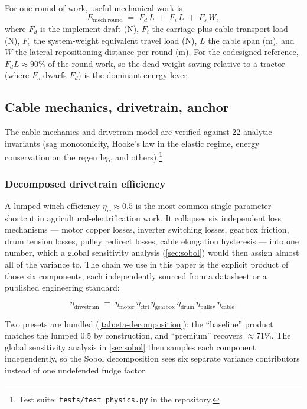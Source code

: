 \documentclass[11pt,a4paper]{article}
\begin{document}
For one round of work, useful mechanical work is
\begin{equation}\label{eq:pass}
E_{\text{mech,round}} \;=\; F_d\,L \;+\; F_i\,L \;+\; F_s\,W,
\end{equation}
where $F_d$ is the implement draft (N), $F_i$ the carriage-plus-cable transport load (N), $F_s$ the system-weight equivalent travel load (N), $L$ the cable span (m), and $W$ the lateral repositioning distance per round (m). For the codesigned reference, $F_d L \approx 90\%$ of the round work, so the dead-weight saving relative to a tractor (where $F_s$ dwarfs $F_d$) is the dominant energy lever.

\subsection{Cable mechanics, drivetrain, anchor}\label{sec:physics}

The cable mechanics and drivetrain model are verified against 22 analytic invariants (sag monotonicity, Hooke's law in the elastic regime, energy conservation on the regen leg, and others).\footnote{Test suite: \texttt{tests/test\_physics.py} in the repository.}

\subsubsection{Decomposed drivetrain efficiency}\label{sec:drivetrain}

A lumped winch efficiency $\eta_w \approx 0.5$ is the most common single-parameter shortcut in agricultural-electrification work. It collapses six independent loss mechanisms --- motor copper losses, inverter switching losses, gearbox friction, drum tension losses, pulley redirect losses, cable elongation hysteresis --- into one number, which a global sensitivity analysis (\cref{sec:sobol}) would then assign almost all of the variance to. The chain we use in this paper is the explicit product of those six components, each independently sourced from a datasheet or a published engineering standard:

\begin{equation}\label{eq:eta-chain}
\eta_{\text{drivetrain}} \;=\; \eta_{\text{motor}} \,\eta_{\text{ctrl}}\, \eta_{\text{gearbox}} \,\eta_{\text{drum}}\, \eta_{\text{pulley}}\, \eta_{\text{cable}}.
\end{equation}

Two presets are bundled (\cref{tab:eta-decomposition}); the ``baseline'' product matches the lumped 0.5 by construction, and ``premium'' recovers ${\approx}71\%$. The global sensitivity analysis in \cref{sec:sobol} then samples each component independently, so the Sobol decomposition sees six separate variance contributors instead of one undefended fudge factor.
\end{document}
